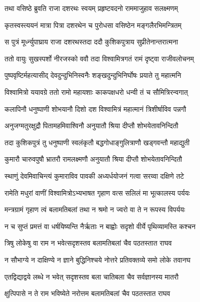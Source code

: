 
\twolineshloka
{तथा वसिष्ठे ब्रुवति राजा दशरथः स्वयम्}
{प्रहृष्टवदनो राममाजुहाव सलक्ष्मणम्} %

\twolineshloka
{कृतस्वस्त्ययनं मात्रा पित्रा दशरथेन च}
{पुरोधसा वसिष्ठेन मङ्गलैरभिमन्त्रितम्} %

\twolineshloka
{स पुत्रं मूर्ध्न्युपाघ्राय राजा दशरथस्तदा}
{ददौ कुशिकपुत्राय सुप्रीतेनान्तरात्मना} %

\twolineshloka
{ततो वायुः सुखस्पर्शो नीरजस्को ववौ तदा}
{विश्वामित्रगतं रामं दृष्ट्वा राजीवलोचनम्} %

\twolineshloka
{पुष्पवृष्टिर्महत्यासीद् देवदुन्दुभिनिस्वनैः}
{शङ्खदुन्दुभिनिर्घोषः प्रयाते तु महात्मनि} %

\twolineshloka
{विश्वामित्रो ययावग्रे ततो रामो महायशाः}
{काकपक्षधरो धन्वी तं च सौमित्रिरन्वगात्} %

\twolineshloka
{कलापिनौ धनुष्पाणी शोभयानौ दिशो दश}
{विश्वामित्रं महात्मानं त्रिशीर्षाविव पन्नगौ} %

\twolineshloka
{अनुजग्मतुरक्षुद्रौ पितामहमिवाश्विनौ}
{अनुयातौ श्रिया दीप्तौ शोभयेतावनिन्दितौ} %

\twolineshloka
{तदा कुशिकपुत्रं तु धनुष्पाणी स्वलंकृतौ}
{बद्धगोधाङ्गुलित्राणौ खड्गवन्तौ महाद्युती} %

\twolineshloka
{कुमारौ चारुवपुषौ भ्रातरौ रामलक्ष्मणौ}
{अनुयातौ श्रिया दीप्तौ शोभयेतावनिन्दितौ} %

\twolineshloka
{स्थाणुं देवमिवाचिन्त्यं कुमाराविव पावकी}
{अध्यर्धयोजनं गत्वा सरय्वा दक्षिणे तटे} %

\twolineshloka
{रामेति मधुरां वाणीं विश्वामित्रोऽभ्यभाषत}
{गृहाण वत्स सलिलं मा भूत्कालस्य पर्ययः} %

\twolineshloka
{मन्त्रग्रामं गृहाण त्वं बलामतिबलां तथा}
{न श्रमो न ज्वरो वा ते न रूपस्य विपर्ययः} %

\twolineshloka
{न च सुप्तं प्रमत्तं वा धर्षयिष्यन्ति नैर्ऋताः}
{न बाह्वोः सदृशो वीर्ये पृथिव्यामस्ति कश्चन} %

\twolineshloka
{त्रिषु लोकेषु वा राम न भवेत्सदृशस्तव}
{बलामतिबलां चैव पठतस्तात राघव} %

\twolineshloka
{न सौभाग्ये न दाक्षिण्ये न ज्ञाने बुद्धिनिश्चये}
{नोत्तरे प्रतिवक्तव्ये समो लोके तवानघ} %

\twolineshloka
{एतद्विद्याद्वये लब्धे न भवेत् सदृशस्तव}
{बला चातिबला चैव सर्वज्ञानस्य मातरौ} %

\twolineshloka
{क्षुत्पिपासे न ते राम भविष्येते नरोत्तम}
{बलामतिबलां चैव पठतस्तात राघव} %

